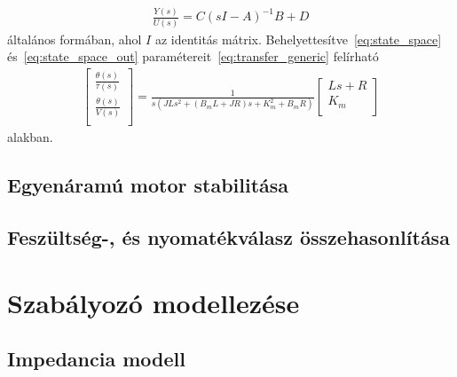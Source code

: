 \begin{align}\label{eq:transfer_generic}
    \frac{Y(s)}{U(s)} = C{\left(sI-A\right)}^{-1}B+D
\end{align}
általános formában, ahol $I$ az identitás mátrix. Behelyettesítve~\eqref{eq:state_space} és~\eqref{eq:state_space_out}
paramétereit~\eqref{eq:transfer_generic} felírható
\begin{align}
    \begin{bmatrix}
        \frac{\theta(s)}{\tau(s)} \\ 
        \frac{\theta(s)}{V(s)} \\ 
    \end{bmatrix}
    =
    \frac{1}{s\left(JLs^2 + \left(B_m L + JR\right)s + K_m^2 + B_m R\right)}
    \begin{bmatrix}
        Ls + R \\ 
        K_m \\ 
    \end{bmatrix}
\end{align}
alakban.

\section{Egyenáramú motor stabilitása}

\section{Feszültség-, és nyomatékválasz összehasonlítása}

\chapter{Szabályozó modellezése}\label{chap:controller}

\section{Impedancia modell}

